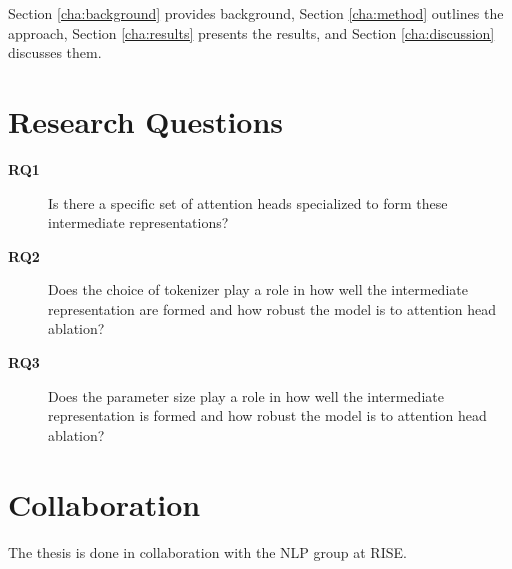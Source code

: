 Section \ref{cha:background} provides background, Section \ref{cha:method} outlines the approach, Section \ref{cha:results} presents the results, and Section \ref{cha:discussion} discusses them.

\section*{Research Questions}
\begin{description}
\item[\textbf{RQ1}]\label{rq1} Is there a specific set of attention heads specialized to form these intermediate representations?
\item[\textbf{RQ2}]\label{rq2} Does the choice of tokenizer play a role in how well the intermediate representation are formed and how robust the model is to attention head ablation?
\item[\textbf{RQ3}]\label{rq3} Does the parameter size play a role in how well the intermediate representation is formed and how robust the model is to attention head ablation?
\end{description}

\section*{Collaboration}

The thesis is done in collaboration with the NLP group at RISE.
